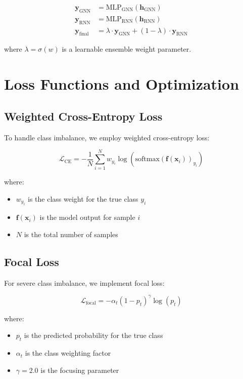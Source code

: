 \documentclass[12pt]{article}
\newcommand{\vecbf}[1]{\mathbf{#1}}
\newcommand{\softmax}{\text{softmax}}
\begin{document}
\begin{align}
\vecbf{y}_{\text{GNN}} &= \text{MLP}_{\text{GNN}}(\vecbf{h}_{\text{GNN}}) \\
\vecbf{y}_{\text{RNN}} &= \text{MLP}_{\text{RNN}}(\vecbf{h}_{\text{RNN}}) \\
\vecbf{y}_{\text{final}} &= \lambda \cdot \vecbf{y}_{\text{GNN}} + (1-\lambda) \cdot \vecbf{y}_{\text{RNN}}
\end{align}

where $\lambda = \sigma(w)$ is a learnable ensemble weight parameter.

\section{Loss Functions and Optimization}

\subsection{Weighted Cross-Entropy Loss}

To handle class imbalance, we employ weighted cross-entropy loss:

\begin{equation}
\mathcal{L}_{\text{CE}} = -\frac{1}{N} \sum_{i=1}^{N} w_{y_i} \log(\softmax(\vecbf{f}(\vecbf{x}_i))_{y_i})
\end{equation}

where:
\begin{itemize}
    \item $w_{y_i}$ is the class weight for the true class $y_i$
    \item $\vecbf{f}(\vecbf{x}_i)$ is the model output for sample $i$
    \item $N$ is the total number of samples
\end{itemize}

\subsection{Focal Loss}

For severe class imbalance, we implement focal loss:

\begin{equation}
\mathcal{L}_{\text{focal}} = -\alpha_t (1-p_t)^\gamma \log(p_t)
\end{equation}

where:
\begin{itemize}
    \item $p_t$ is the predicted probability for the true class
    \item $\alpha_t$ is the class weighting factor
    \item $\gamma = 2.0$ is the focusing parameter
\end{itemize}
\end{document}
